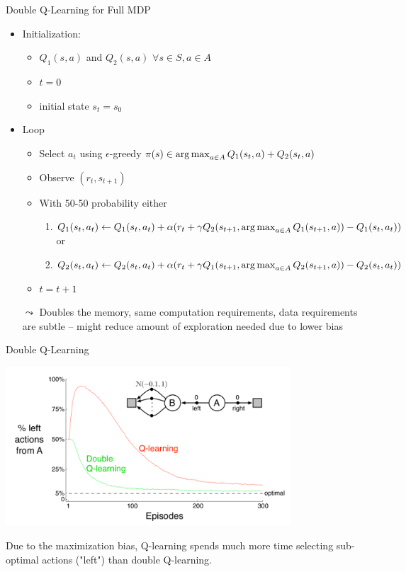 \documentclass[aspectratio=169]{../latex_main/tntbeamer}  %
\begin{document}
\begin{frame}[c]{Double Q-Learning for Full MDP}	
	
	\begin{itemize}
		\item Initialization:
		\begin{itemize}
			\item $Q_1(s,a)$ and $Q_2(s,a)$ $\forall s \in S, a\in A$
			\item $t= 0$
			\item initial state $s_t = s_0$
		\end{itemize}
		\item Loop
		\begin{itemize}
			\item Select $a_t$ using $\epsilon$-greedy $\pi(s) \in \operatorname*{arg\,max}_{a \in A} Q_1(s_t, a) + Q_2(s_t , a)$
			\item Observe $(r_t, s_{t+1})$
			\item With 50-50 probability either
			\begin{enumerate}
				\item $Q_1(s_t, a_t) \gets Q_1(s_t, a_t) + \alpha (r_t +\gamma Q_2(s_{t+1}, \operatorname*{arg\,max}_{a \in A} Q_1(s_{t+1},a) ) - Q_1(s_t, a_t))$\\
				or
				\item $Q_2(s_t, a_t) \gets Q_2(s_t, a_t) + \alpha (r_t +\gamma Q_1(s_{t+1}, \operatorname*{arg\,max}_{a \in A} Q_2(s_{t+1},a) ) - Q_2(s_t, a_t))$
			\end{enumerate}
			\item $t = t + 1 $
		\end{itemize}
		\bigskip
		\pause
		\item[$\leadsto$] Doubles the memory, same computation requirements, data requirements are subtle -- might reduce amount of exploration needed due to lower bias
	\end{itemize}
	
	
\end{frame}
\begin{frame}[c]{Double Q-Learning~}
	
\begin{center}
\includegraphics[width=0.8\textwidth]{images/double_q.png}
\end{center}

Due to the maximization bias, Q-learning spends much more time
selecting sub-optimal actions ("left") than double Q-learning.
	
	
\end{frame}
\end{document}
